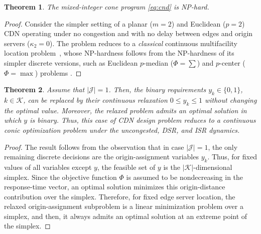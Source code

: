 \documentclass[a4paper,11pt,reqno]{amsart}
\newtheorem{theorem}{Theorem}
\DeclareMathOperator{\st}{subject\; to}
\newcommand{\R}{\mathbb{R}}
\newcommand{\LL}{\mathcal{L}}
\newcommand{\K}{\mathcal{K}}
\newcommand{\I}{\mathcal{I}}
\newcommand{\J}{\mathcal{J}}
\begin{document}
\begin{theorem}\label{th:complexity}
    The mixed-integer cone program \eqref{eq:cnd} is {\rm NP}-hard.
\end{theorem}

\begin{proof}
    Consider the simpler setting of a planar ($m=2$) and Euclidean ($p=2$) CDN operating under no congestion and with no delay between edges and origin servers ($\kappa_2=0$). %
    The problem reduces to a \textit{classical} continuous multifacility location problem~\citep{blanco2014revisiting}, whose NP-hardness  follows from the NP-hardness of its simpler discrete versions, such as Euclidean $p$-median ($\Phi=\sum$) and $p$-center ($\Phi=\max$) problems \citep[see, e.g.,][]{megiddo1984complexity}.
\end{proof}

\begin{theorem}\label{th:single_edge_continuous}
Assume that $|\J|=1$. Then, the binary requirements $y_k\in\{0,1\}$, $k\in\K$,
can be replaced by their continuous relaxation $0\leq y_k\leq 1$ without changing the optimal value. Moreover, the relaxed problem admits an optimal solution in which $y$ is binary. Thus, this case of {\rm CDN} design problem reduces to a continuous conic optimization problem under the uncongested, {\rm DSR}, and {\rm ISR} dynamics.
\end{theorem}
\begin{proof}
The result follows from the observation that in case $|\J|=1$, the only remaining discrete decisions are the origin-assignment variables $y_k$. Thus, for fixed values of all variables except $y$, the feasible set of $y$ is the $|\K|$-dimensional simplex. Since the objective function $\Phi$ is assumed to be nondecreasing in the response-time vector, an optimal solution minimizes this origin-distance contribution over the simplex. Therefore, for fixed edge server location, the relaxed origin-assignment subproblem is a linear minimization problem over a simplex, and then, it always admits an optimal solution at an extreme point of the simplex.
\end{proof}
\end{document}
